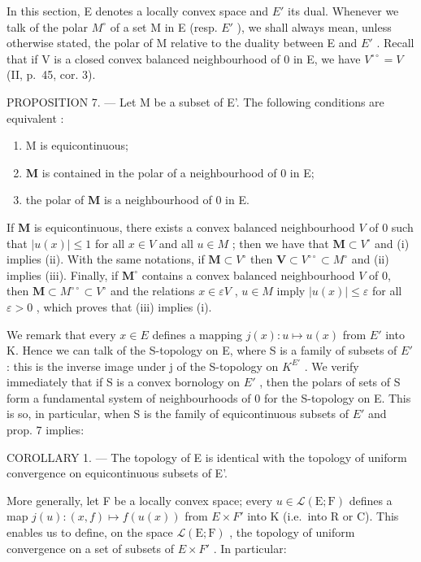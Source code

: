 In this section, E denotes a locally convex space and \(E'\) its dual. Whenever we talk of the polar \(M^{\circ}\) of a set M in E (resp. \(E'\) ), we shall always mean, unless otherwise stated, the polar of M relative to the duality between E and \(E'\) . Recall that if V is a closed convex balanced neighbourhood of 0 in E, we have \(V^{\circ\circ}=V\) (II, p.~45, cor. 3).

PROPOSITION 7. --- Let M be a subset of E'. The following conditions are equivalent :

\begin{enumerate}
\def\labelenumi{(\roman{enumi})}
\item
  M is equicontinuous;
\item
  \(\mathbf{M}\) is contained in the polar of a neighbourhood of 0 in E;
\item
  the polar of \(\mathbf{M}\) is a neighbourhood of 0 in E.
\end{enumerate}

If \(\mathbf{M}\) is equicontinuous, there exists a convex balanced neighbourhood \(V\) of 0 such that \(|u(x)| \leqslant 1\) for all \(x \in V\) and all \(u \in M\) ; then we have that \(\mathbf{M} \subset V^{\circ}\) and (i) implies (ii). With the same notations, if \(\mathbf{M} \subset V^{\circ}\) then \(\mathbf{V} \subset V^{\circ \circ} \subset M^{\circ}\) and (ii) implies (iii). Finally, if \(\mathbf{M}^{\circ}\) contains a convex balanced neighbourhood \(V\) of 0, then \(\mathbf{M} \subset M^{\circ \circ} \subset V^{\circ}\) and the relations \(x \in \varepsilon V\) , \(u \in M\) imply \(|u(x)| \leqslant \varepsilon\) for all \(\varepsilon > 0\) , which proves that (iii) implies (i).

We remark that every \(x \in E\) defines a mapping \(j(x): u \mapsto u(x)\) from \(E'\) into K. Hence we can talk of the S-topology on E, where S is a family of subsets of \(E'\) : this is the inverse image under j of the S-topology on \(K^{E'}\) . We verify immediately that if S is a convex bornology on \(E'\) , then the polars of sets of S form a fundamental system of neighbourhoods of 0 for the S-topology on E. This is so, in particular, when S is the family of equicontinuous subsets of \(E'\) and prop. 7 implies:

COROLLARY 1. --- The topology of E is identical with the topology of uniform convergence on equicontinuous subsets of E'.

More generally, let F be a locally convex space; every \(u \in \mathcal{L}(\mathrm{E}; \mathrm{F})\) defines a map \(j(u):(x, f) \mapsto f(u(x))\) from \(E \times F'\) into K (i.e.~into R or C). This enables us to define, on the space \(\mathcal{L}(\mathrm{E}; \mathrm{F})\) , the topology of uniform convergence on a set of subsets of \(E \times F'\) . In particular:

